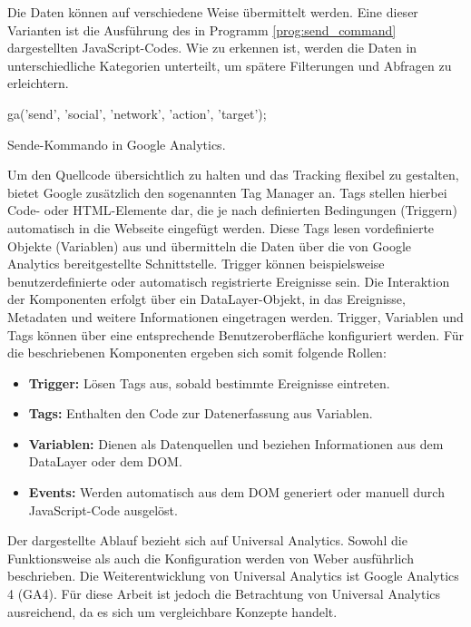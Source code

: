 Die Daten können auf verschiedene Weise übermittelt werden. Eine dieser Varianten ist die Ausführung des in Programm \ref{prog:send_command} dargestellten JavaScript-Codes. Wie zu erkennen ist, werden die Daten in unterschiedliche Kategorien unterteilt, um spätere Filterungen und Abfragen zu erleichtern.

\begin{program}[H]
\begin{JsCode}
ga('send', 'social', 'network', 'action', 'target');
\end{JsCode}
\caption{Sende-Kommando in Google Analytics.}
\label{prog:send_command}
\end{program}

Um den Quellcode übersichtlich zu halten und das Tracking flexibel zu gestalten, bietet Google zusätzlich den sogenannten Tag Manager an. 
Tags stellen hierbei Code- oder HTML-Elemente dar, die je nach definierten Bedingungen (Triggern) automatisch in die Webseite eingefügt werden. 
Diese Tags lesen vordefinierte Objekte (Variablen) aus und übermitteln die Daten über die von Google Analytics bereitgestellte Schnittstelle. 
Trigger können beispielsweise benutzerdefinierte oder automatisch registrierte Ereignisse sein. 
Die Interaktion der Komponenten erfolgt über ein DataLayer-Objekt, in das Ereignisse, Metadaten und weitere Informationen eingetragen werden. 
Trigger, Variablen und Tags können über eine entsprechende Benutzeroberfläche konfiguriert werden. 
Für die beschriebenen Komponenten ergeben sich somit folgende Rollen:

\begin{itemize}
    \item \textbf{Trigger:} Lösen Tags aus, sobald bestimmte Ereignisse eintreten.
    \item \textbf{Tags:} Enthalten den Code zur Datenerfassung aus Variablen.
    \item \textbf{Variablen:} Dienen als Datenquellen und beziehen Informationen aus dem DataLayer oder dem DOM.
    \item \textbf{Events:} Werden automatisch aus dem DOM generiert oder manuell durch JavaScript-Code ausgelöst.
\end{itemize}

Der dargestellte Ablauf bezieht sich auf Universal Analytics. Sowohl die Funktionsweise als auch die Konfiguration werden von Weber \cite{weber2015practical} ausführlich beschrieben. Die Weiterentwicklung von Universal Analytics ist Google Analytics 4 (GA4). Für diese Arbeit ist jedoch die Betrachtung von Universal Analytics ausreichend, da es sich um vergleichbare Konzepte handelt.

